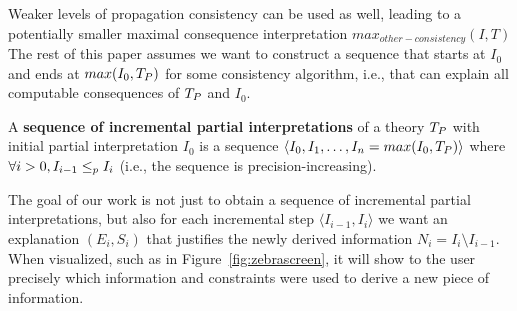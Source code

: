Weaker levels of propagation consistency can be used as well, leading to a potentially smaller maximal consequence interpretation $max_{other-consistency}(I,T)$
The rest of this paper assumes we want to construct a sequence that starts at $I_0$ and ends at $max(I_0,T_P)$ for some consistency algorithm, i.e., that can explain all computable consequences of $T_P$ and $I_0$. %


% 




\begin{definition}
A \textbf{sequence of incremental partial interpretations} of a theory $T_P$ with initial partial interpretation $I_0$ is a sequence $\langle I_0, I_1, \ldots, I_n  = max(I_0,T_P)\rangle$ where $\forall i>0, I_{i-1} \leq_p I_{i}$ (i.e., the sequence is precision-increasing).
\end{definition} 

The goal of our work is not just to obtain a sequence of incremental partial interpretations, but also 
% 
for each incremental step $\langle I_{i-1}, I_i \rangle$ we want an explanation $(E_i,S_i)$ that justifies the newly derived information $N_i = I_i \setminus I_{i-1}$. When visualized, such as in Figure~\ref{fig:zebrascreen}, it will show to the user precisely which information and constraints were used to derive a new piece of information.


